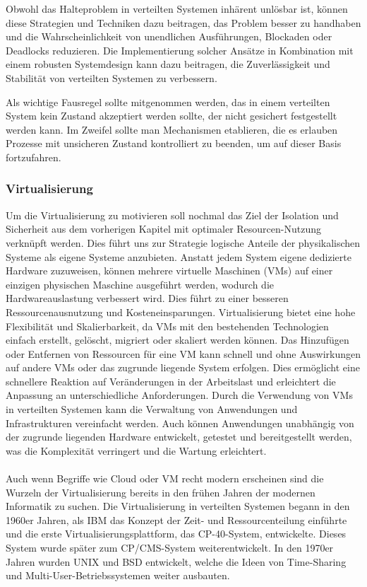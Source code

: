 Obwohl das Halteproblem in verteilten Systemen inhärent unlösbar ist, können diese Strategien und Techniken dazu beitragen, das Problem besser zu handhaben und die Wahrscheinlichkeit von unendlichen Ausführungen, Blockaden oder Deadlocks reduzieren. Die Implementierung solcher Ansätze in Kombination mit einem robusten Systemdesign kann dazu beitragen, die Zuverlässigkeit und Stabilität von verteilten Systemen zu verbessern.

Als wichtige Fausregel sollte mitgenommen werden, das in einem verteilten System kein Zustand akzeptiert werden sollte, der nicht gesichert festgestellt werden kann. Im Zweifel sollte man Mechanismen etablieren, die es erlauben Prozesse mit unsicheren Zustand kontrolliert zu beenden, um auf dieser Basis fortzufahren. 

\subsubsection{Virtualisierung}
Um die Virtualisierung zu motivieren soll nochmal das Ziel der Isolation und Sicherheit aus dem vorherigen Kapitel mit optimaler Resourcen-Nutzung verknüpft werden. Dies führt uns zur Strategie logische Anteile der physikalischen Systeme als eigene Systeme anzubieten. Anstatt jedem System eigene dedizierte Hardware zuzuweisen, können mehrere virtuelle Maschinen (VMs) auf einer einzigen physischen Maschine ausgeführt werden, wodurch die Hardwareauslastung verbessert wird. Dies führt zu einer besseren Ressourcenausnutzung und Kosteneinsparungen. Virtualisierung bietet eine hohe Flexibilität und Skalierbarkeit, da VMs mit den bestehenden Technologien einfach erstellt, gelöscht, migriert oder skaliert werden können. Das Hinzufügen oder Entfernen von Ressourcen für eine VM kann schnell und ohne Auswirkungen auf andere VMs oder das zugrunde liegende System erfolgen. Dies ermöglicht eine schnellere Reaktion auf Veränderungen in der Arbeitslast und erleichtert die Anpassung an unterschiedliche Anforderungen. Durch die Verwendung von VMs in verteilten Systemen kann die Verwaltung von Anwendungen und Infrastrukturen vereinfacht werden. Auch können Anwendungen unabhängig von der zugrunde liegenden Hardware entwickelt, getestet und bereitgestellt werden, was die Komplexität verringert und die Wartung erleichtert. 
\\\\
Auch wenn Begriffe wie Cloud oder VM recht modern erscheinen sind die Wurzeln der Virtualisierung bereits in den frühen Jahren der modernen Informatik zu suchen. Die Virtualisierung in verteilten Systemen begann in den 1960er Jahren, als IBM das Konzept der Zeit- und Ressourcenteilung einführte und die erste Virtualisierungsplattform, das CP-40-System, entwickelte. Dieses System wurde später zum CP/CMS-System weiterentwickelt. In den 1970er Jahren wurden UNIX und BSD entwickelt, welche die Ideen von Time-Sharing und Multi-User-Betriebssystemen weiter ausbauten.

